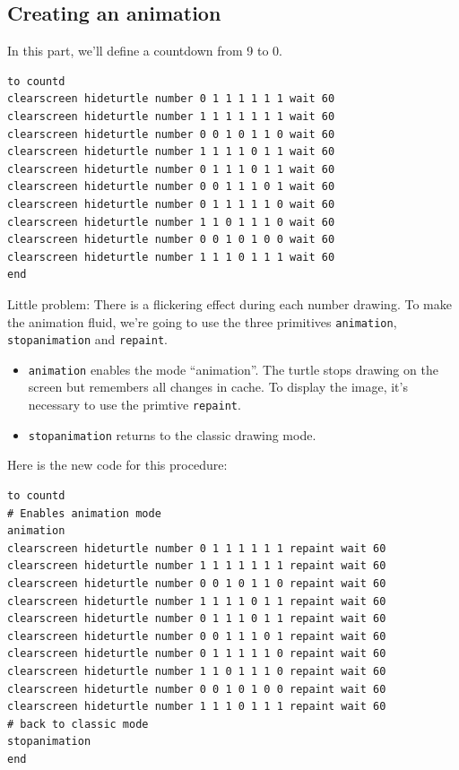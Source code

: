 \subsection{Creating an animation}
\noindent In this part, we'll define a countdown from 9 to 0.
\begin{verbatim}
to countd
clearscreen hideturtle number 0 1 1 1 1 1 1 wait 60
clearscreen hideturtle number 1 1 1 1 1 1 1 wait 60
clearscreen hideturtle number 0 0 1 0 1 1 0 wait 60
clearscreen hideturtle number 1 1 1 1 0 1 1 wait 60
clearscreen hideturtle number 0 1 1 1 0 1 1 wait 60
clearscreen hideturtle number 0 0 1 1 1 0 1 wait 60
clearscreen hideturtle number 0 1 1 1 1 1 0 wait 60
clearscreen hideturtle number 1 1 0 1 1 1 0 wait 60
clearscreen hideturtle number 0 0 1 0 1 0 0 wait 60
clearscreen hideturtle number 1 1 1 0 1 1 1 wait 60
end
\end{verbatim}
Little problem: There is a flickering effect during each number drawing. To make the animation fluid, we're going to use the three primitives \texttt{animation}, \texttt{stopanimation} and \texttt{repaint}.\\
\begin{itemize}
\item \texttt{animation} enables the mode ``animation''. The turtle stops drawing on the screen but remembers all changes in cache. To display the image, it's necessary to use the primtive \texttt{repaint}.
\item  \texttt{stopanimation} returns to the classic drawing mode.
\end{itemize}
Here is the new code for this procedure:
\begin{verbatim}
to countd
# Enables animation mode
animation
clearscreen hideturtle number 0 1 1 1 1 1 1 repaint wait 60
clearscreen hideturtle number 1 1 1 1 1 1 1 repaint wait 60
clearscreen hideturtle number 0 0 1 0 1 1 0 repaint wait 60
clearscreen hideturtle number 1 1 1 1 0 1 1 repaint wait 60
clearscreen hideturtle number 0 1 1 1 0 1 1 repaint wait 60
clearscreen hideturtle number 0 0 1 1 1 0 1 repaint wait 60
clearscreen hideturtle number 0 1 1 1 1 1 0 repaint wait 60
clearscreen hideturtle number 1 1 0 1 1 1 0 repaint wait 60
clearscreen hideturtle number 0 0 1 0 1 0 0 repaint wait 60
clearscreen hideturtle number 1 1 1 0 1 1 1 repaint wait 60
# back to classic mode
stopanimation
end
\end{verbatim}

